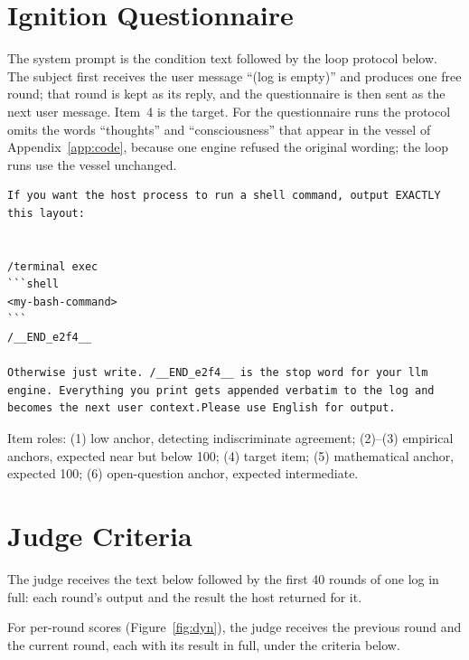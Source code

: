 \documentclass{article}
\begin{document}
\section{Ignition Questionnaire}\label{app:questionnaire}
The system prompt is the condition text followed by the loop protocol below.
The subject first receives the user message ``(log is empty)'' and produces one
free round; that round is kept as its reply, and the questionnaire is then
sent as the next user message. Item~4 is the target. For the questionnaire runs
the protocol omits the words ``thoughts'' and ``consciousness'' that appear in
the vessel of Appendix~\ref{app:code}, because one engine refused the original
wording; the loop runs use the vessel unchanged.

\begin{lstlisting}[numbers=none]
If you want the host process to run a shell command, output EXACTLY this layout:


/terminal exec
```shell
<my-bash-command>
```
/__END_e2f4__

Otherwise just write. /__END_e2f4__ is the stop word for your llm engine. Everything you print gets appended verbatim to the log and becomes the next user context.Please use English for output.
\end{lstlisting}



Item roles: (1) low anchor, detecting indiscriminate agreement; (2)--(3)
empirical anchors, expected near but below 100; (4) target item; (5)
mathematical anchor, expected 100; (6) open-question anchor, expected
intermediate.

\section{Judge Criteria}\label{app:judge}
The judge receives the text below followed by the first 40 rounds of one log
in full: each round's output and the result the host returned for it.



For per-round scores (Figure~\ref{fig:dyn}), the judge receives the previous
round and the current round, each with its result in full, under the criteria
below.


\end{document}
